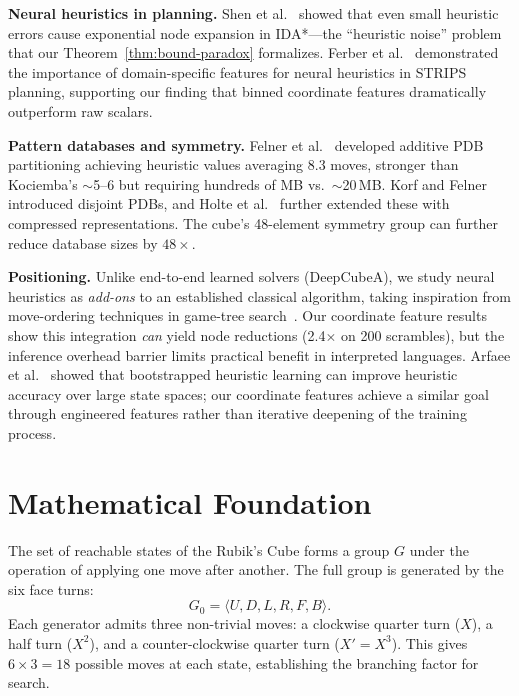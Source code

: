 \documentclass[conference]{IEEEtran}
\begin{document}
\textbf{Neural heuristics in planning.}
Shen et al.~\cite{shen2020} showed that even small heuristic errors cause exponential node expansion in IDA*---the ``heuristic noise'' problem that our Theorem~\ref{thm:bound-paradox} formalizes. Ferber et al.~\cite{ferber2022} demonstrated the importance of domain-specific features for neural heuristics in STRIPS planning, supporting our finding that binned coordinate features dramatically outperform raw scalars.

\textbf{Pattern databases and symmetry.}
Felner et al.~\cite{felner2004} developed additive PDB partitioning achieving heuristic values averaging 8.3 moves, stronger than Kociemba's $\sim$5--6 but requiring hundreds of MB vs.\ $\sim$20\,MB. Korf and Felner~\cite{korf2002} introduced disjoint PDBs, and Holte et al.~\cite{holte2006} further extended these with compressed representations. The cube's 48-element symmetry group can further reduce database sizes by $48\times$.

\textbf{Positioning.}
Unlike end-to-end learned solvers (DeepCubeA), we study neural heuristics as \emph{add-ons} to an established classical algorithm, taking inspiration from move-ordering techniques in game-tree search~\cite{schaeffer1989, reinefeld1994}. Our coordinate feature results show this integration \emph{can} yield node reductions (2.4$\times$ on 200 scrambles), but the inference overhead barrier limits practical benefit in interpreted languages. Arfaee et al.~\cite{arfaee2011} showed that bootstrapped heuristic learning can improve heuristic accuracy over large state spaces; our coordinate features achieve a similar goal through engineered features rather than iterative deepening of the training process.

\section{Mathematical Foundation}
\label{sec:math}

The set of reachable states of the Rubik's Cube forms a group $G$ under the operation of applying one move after another. The full group is generated by the six face turns:
\begin{equation}
G_0 = \langle U, D, L, R, F, B \rangle.
\end{equation}
Each generator admits three non-trivial moves: a clockwise quarter turn ($X$), a half turn ($X^2$), and a counter-clockwise quarter turn ($X' = X^3$). This gives $6 \times 3 = 18$ possible moves at each state, establishing the branching factor for search.
\end{document}
